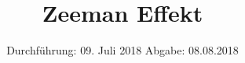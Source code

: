 

\subject{V27}
\title{Zeeman Effekt}
\date{
  Durchführung: 09. Juli 2018
  \hspace{3em}
  Abgabe: 08.08.2018
}



\maketitle
\tableofcontents
\newpage







\printbibliography


